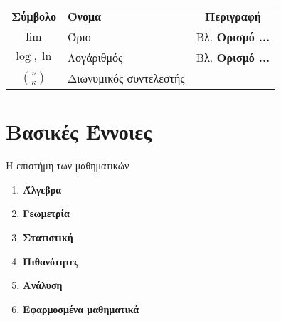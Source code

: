 \documentclass[twoside,10pt]{book}
\begin{document}
\newpage
\noindent
{\par\centering
\begin{tabularx}{\textwidth}{c>{\centering}m{3.1cm}C}
\hline\rule[-2ex]{0pt}{5.5ex}\textbf{Σύμβολο} & \textbf{Όνομα} & \textbf{Περιγραφή}\\
\hhline{===}\rule[-2ex]{0pt}{5.5ex}
$ \lim $ & Όριο & Βλ. \textbf{Ορισμό ...} \\
\rule[-2ex]{0pt}{5.5ex}
$ \log, \ln $ & Λογάριθμός & Βλ. \textbf{Ορισμό ...} \\
\rule[-2ex]{0pt}{8.5ex}
$ \displaystyle\binom{\nu}{\kappa} $ & Διωνυμικός συντελεστής &  \\
\hline
\end{tabularx}
\par}
\chapter*{Βασικές Έννοιες}
Η επιστήμη των μαθηματικών
\begin{enumerate}[label=\large{\bf Α-\arabic*.}]
\item \textbf{\MakeUppercase Άλγεβρα}\\
\item \textbf{\MakeUppercase Γεωμετρία}\\
\item \textbf{\MakeUppercase Στατιστική}\\
\item \textbf{\MakeUppercase Πιθανότητες}\\
\item \textbf{\MakeUppercase Ανάλυση}\\
\item \textbf{\MakeUppercase Εφαρμοσμένα μαθηματικά}\\
\end{enumerate}
\end{document}
